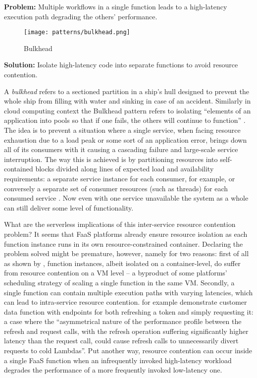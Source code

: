 \textbf{Problem:} Multiple workflows in a single function leads to a high-latency execution path degrading the others' performance.

\begin{figure}[h]
  \centering
  \texttt{[image: patterns/bulkhead.png]}
  \caption{Bulkhead}
  \label{fig:bulkhead}
\end{figure}

\textbf{Solution:} Isolate high-latency code into separate functions to avoid resource contention.

A \textit{bulkhead} refers to a sectioned partition in a ship's hull designed to prevent the whole ship from filling with water and sinking in case of an accident. Similarly in cloud computing context the Bulkhead pattern refers to isolating ``elements of an application into pools so that if one fails, the others will continue to function'' \parencite{microsoft18cloudPatterns}. The idea is to prevent a situation where a single service, when facing resource exhaustion due to a load peak or some sort of an application error, brings down all of its consumers with it causing a cascading failure and large-scale service interruption. The way this is achieved is by partitioning resources into self-contained blocks divided along lines of expected load and availability requirements: a separate service instance for each consumer, for example, or conversely a separate set of consumer resources (such as threads) for each consumed service \parencite{nygard07releaseIt}. Now even with one service unavailable the system as a whole can still deliver some level of functionality.

What are the serverless implications of this inter-service resource contention problem? It seems that FaaS platforms already ensure resource isolation as each function instance runs in its own resource-constrained container. Declaring the problem solved might be premature, however, namely for two reasons: first of all as shown by \textcite{wang18peekingbehindcurtains}, function instances, albeit isolated on a container-level, do suffer from resource contention on a VM level -- a byproduct of some platforms' scheduling strategy of scaling a single function in the same VM. Secondly, a single function can contain multiple execution paths with varying latencies, which can lead to intra-service resource contention. \textcite{bardsley18optimizationStrategies} for example demonstrate customer data function with endpoints for both refreshing a token and simply requesting it: a case
where the ``asymmetrical nature of the performance profile between the refresh and request calls, with the refresh operation suffering significantly higher latency than the request call, could cause refresh calls to unnecessarily divert requests to cold Lambdas''. Put another way, resource contention can occur inside a single FaaS function when an infrequently invoked high-latency workload degrades the performance of a more frequently invoked low-latency one.

